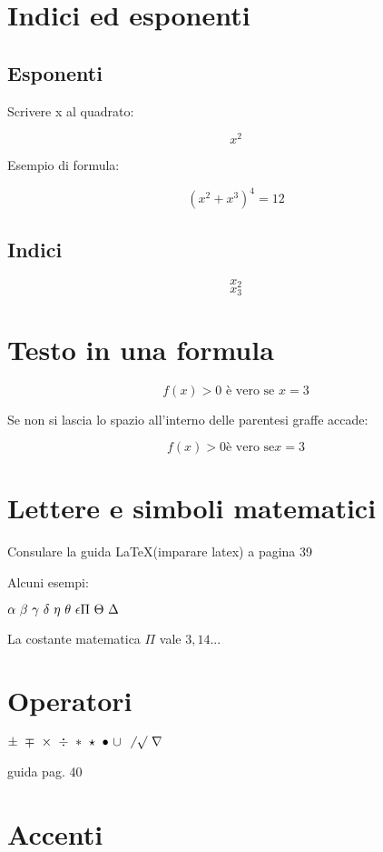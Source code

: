\documentclass[a4paper]{article}
\begin{document}
\section{Indici ed esponenti}

\subsection{Esponenti}

Scrivere x al quadrato:

$$ x^2 $$

Esempio di formula:

$$ (x^2 + x^3)^4 = 12 $$

\subsection{Indici}

$$ x_2 $$
$$ x_3 $$

\section{Testo in una formula}
$$ f(x)> 0 \mbox{ è vero se } x=3 $$ %

Se non si lascia lo spazio all'interno delle parentesi graffe accade:

$$ f(x)>0 \mbox{è vero se} x=3$$

\section{Lettere e simboli matematici}

Consulare la guida \LaTeX (imparare latex) a pagina 39

Alcuni esempi:

$ \alpha\ \beta\ \gamma\ \delta\ \eta\ \theta\ \epsilon\\ \Pi\ \Theta\ \Delta\ $

La costante matematica $\Pi$ vale $3,14...$

\section{Operatori}

$ \pm\ \mp\ \times\ \div\ \ast\ \star\ \bullet\ \cup\ \not\ \surd\ \nabla $

guida pag. 40

\section{Accenti}
\end{document}
